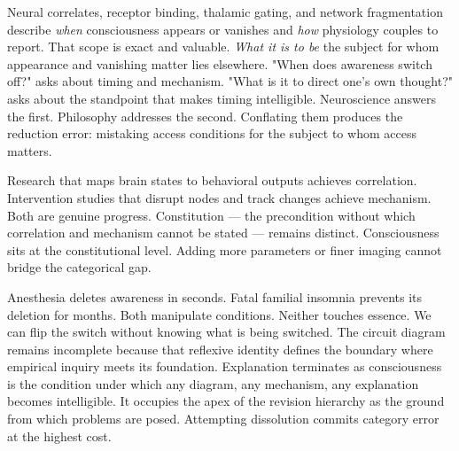 Neural correlates, receptor binding, thalamic gating, and network fragmentation describe \textit{when} consciousness appears or vanishes and \textit{how} physiology couples to report. That scope is exact and valuable. \textit{What it is to be} the subject for whom appearance and vanishing matter lies elsewhere. "When does awareness switch off?" asks about timing and mechanism. "What is it to direct one's own thought?" asks about the standpoint that makes timing intelligible. Neuroscience answers the first. Philosophy addresses the second. Conflating them produces the reduction error: mistaking access conditions for the subject to whom access matters.

Research that maps brain states to behavioral outputs achieves correlation. Intervention studies that disrupt nodes and track changes achieve mechanism. Both are genuine progress. Constitution — the precondition without which correlation and mechanism cannot be stated — remains distinct. Consciousness sits at the constitutional level. Adding more parameters or finer imaging cannot bridge the categorical gap.

Anesthesia deletes awareness in seconds. Fatal familial insomnia prevents its deletion for months. Both manipulate conditions. Neither touches essence. We can flip the switch without knowing what is being switched. The circuit diagram remains incomplete because that reflexive identity defines the boundary where empirical inquiry meets its foundation. Explanation terminates as consciousness is the condition under which any diagram, any mechanism, any explanation becomes intelligible. It occupies the apex of the revision hierarchy as the ground from which problems are posed. Attempting dissolution commits category error at the highest cost.

